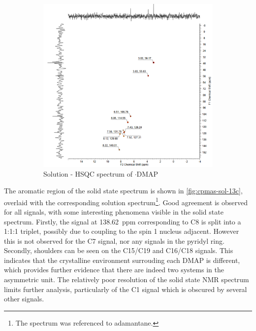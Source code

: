 \begin{refsection}
\begin{figure}
    \begin{subfigure}[t]{\linewidth}
    \centering
    \includegraphics[width=0.75\linewidth]{Figures/ebs-4ome-dmap-sol-hsqc.pdf}
    \caption{Solution - HSQC spectrum of $\cdot$DMAP}
    \label{fig:ebs-4ome-dmap-sol-hsqc}
    \end{subfigure}
    \caption{}
    \label{fig:ebs-4ome-dmap-sol}
\end{figure}

The aromatic region of the solid state  spectrum is shown in \cref{fig:cpmas-sol-13c}, overlaid with the corresponding solution spectrum\footnote{The  spectrum was referenced to adamantane.}.
Good agreement is observed for all signals, with some interesting phenomena visible in the solid state spectrum.
Firstly, the signal at 138.62~ppm corresponding to C8 is split into a 1:1:1 triplet, possibly due to coupling to the spin 1  nucleus adjacent.
However this is not observed for the C7 signal, nor any signals in the pyridyl ring.
Secondly, shoulders can be seen on the C15/C19 and C16/C18 signals.
This indicates that the crystalline environment surrouding each DMAP is different, which provides further evidence that there are indeed two systems in the asymmetric unit.
The relatively poor resolution of the solid state  NMR spectrum limits further analysis, particularly of the C1 signal which is obscured by several other signals.


\end{refsection}
